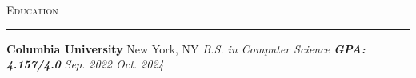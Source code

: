 \documentclass[11pt,letterpaper]{article}
\begin{document}
\vspace{6pt}
\textsc{\large{Education}} 
\vspace{4pt}
\hrule
\begin{list}{}{\setlength{\leftmargin}{1em}\setlength{\rightmargin}{2pt}}
    \item
          

        
            \textbf{Columbia University} \hfill  {New York, NY}
            \vspace{2pt} \newline
            \small{\textit{B.S. in Computer Science \textbf{GPA: 4.157/4.0}}} \hfill {\small{\textit{Sep. 2022 \textendash \space Oct. 2024}}}
            \vspace{0pt}
\end{list}

\end{document}
